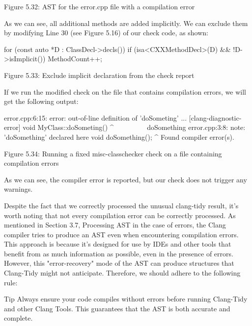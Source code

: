 \begin{center}
Figure 5.32: AST for the error.cpp file with a compilation error
\end{center}

As we can see, all additional methods are added implicitly. We can exclude them by modifying Line 30 (see Figure 5.16) of our check code, as shown:

\begin{cpp}
for (const auto *D : ClassDecl->decls()) {
  if (isa<CXXMethodDecl>(D) && !D->isImplicit())
    MethodCount++;
}
\end{cpp}


\begin{center}
Figure 5.33: Exclude implicit declaration from the check report
\end{center}

If we run the modified check on the file that contains compilation errors, we will get the following output:

\begin{shell}
error.cpp:6:15: error: out-of-line definition of 'doSometing' ...
[clang-diagnostic-error]
void MyClass::doSometing() {}
              ^~~~~~~~~~
doSomething
error.cpp:3:8: note: 'doSomething' declared here
  void doSomething();
       ^
Found compiler error(s).
\end{shell}

\begin{center}
Figure 5.34: Running a fixed misc-classchecker check on a file containing compilation errors
\end{center}

As we can see, the compiler error is reported, but our check does not trigger any warnings.

Despite the fact that we correctly processed the unusual clang-tidy result, it's worth noting that not every compilation error can be correctly processed. As mentioned in Section 3.7, Processing AST in the case of errors, the Clang compiler tries to produce an AST even when encountering compilation errors. This approach is because it's designed for use by IDEs and other tools that benefit from as much information as possible, even in the presence of errors. However, this "error-recovery" mode of the AST can produce structures that Clang-Tidy might not anticipate. Therefore, we should adhere to the following rule:


\begin{myTip}{Tip}
Always ensure your code compiles without errors before running Clang-Tidy and other Clang Tools. This guarantees that the AST is both accurate and complete.
\end{myTip}

